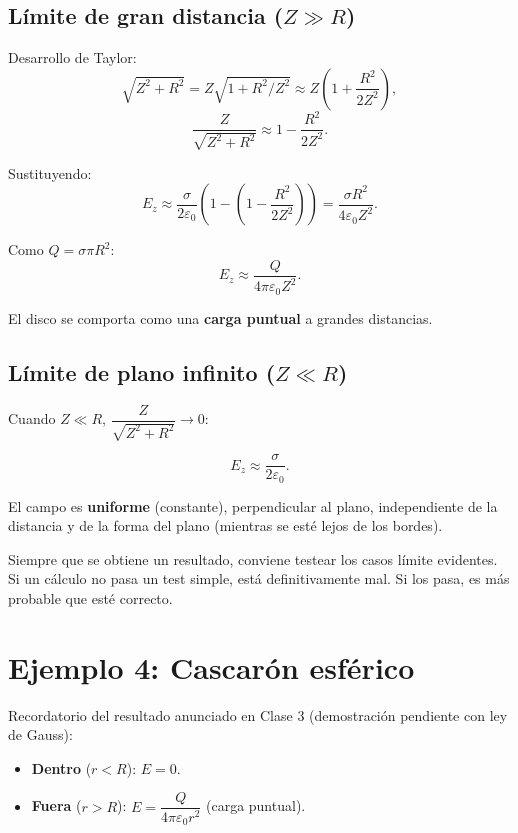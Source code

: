 \documentclass[12pt,a4paper]{article}
\begin{document}
\subsection{Límite de gran distancia ($Z \gg R$)}

Desarrollo de Taylor:
\[
\sqrt{Z^{2} + R^{2}} = Z\sqrt{1 + R^{2}/Z^{2}}
                     \approx Z\left(1 + \frac{R^{2}}{2Z^{2}}\right),
\]
\[
\frac{Z}{\sqrt{Z^{2} + R^{2}}} \approx 1 - \frac{R^{2}}{2Z^{2}}.
\]

Sustituyendo:
\[
E_z \approx \frac{\sigma}{2\varepsilon_0}
          \left(1 - \left(1 - \frac{R^{2}}{2Z^{2}}\right)\right)
        = \frac{\sigma R^{2}}{4\varepsilon_0 Z^{2}}.
\]

Como $Q = \sigma \pi R^{2}$:
\[
\boxed{E_z \approx \frac{Q}{4\pi\varepsilon_0 Z^{2}}}.
\]

El disco se comporta como una \textbf{carga puntual} a grandes
distancias.

\subsection{Límite de plano infinito ($Z \ll R$)}

Cuando $Z \ll R$, $\dfrac{Z}{\sqrt{Z^{2} + R^{2}}} \to 0$:

\[
\boxed{E_z \approx \frac{\sigma}{2\varepsilon_0}}.
\]

\begin{keybox}
  El campo es \textbf{uniforme} (constante), perpendicular al plano,
  independiente de la distancia y de la forma del plano (mientras se
  esté lejos de los bordes).
\end{keybox}

\begin{notebox}
  Siempre que se obtiene un resultado, conviene testear los casos
  límite evidentes. Si un cálculo no pasa un test simple, está
  definitivamente mal. Si los pasa, es más probable que esté correcto.
\end{notebox}

\section{Ejemplo 4: Cascarón esférico}

Recordatorio del resultado anunciado en Clase 3 (demostración
pendiente con ley de Gauss):
\begin{itemize}[nosep]
  \item \textbf{Dentro} ($r < R$): $E = 0$.
  \item \textbf{Fuera} ($r > R$):
        $E = \dfrac{Q}{4\pi\varepsilon_0 r^{2}}$ (carga puntual).
\end{itemize}
\end{document}
